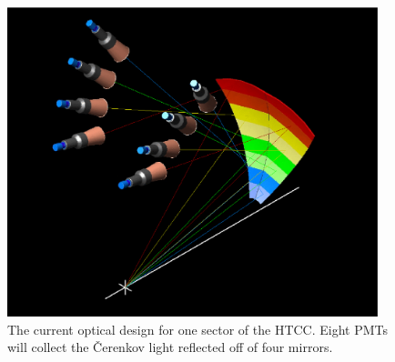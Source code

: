 \begin{figure}
\hspace{0.5cm}
\begin{centering}
\includegraphics[height=9.0cm]{PMT-studies/vpk_2.eps}
\vspace{0.5cm}
\caption{\small{The current optical design for one sector of the HTCC. 
Eight PMTs will collect the {\v C}erenkov light reflected off of four 
mirrors.}}
\label{HTCC_design}
\end{centering}
\end{figure}

